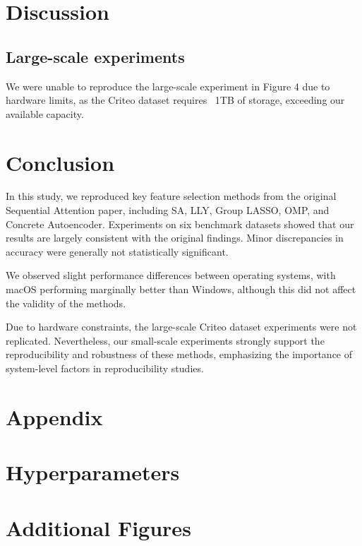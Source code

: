 \documentclass[a4paper,twocolumn]{article} %
\begin{document}
\section{Discussion}


\subsection{ Large-scale experiments}
We were unable to reproduce the large-scale experiment in Figure 4 due to hardware limits, as the Criteo dataset requires ~1TB of storage, exceeding our available capacity.

\section{Conclusion}
In this study, we reproduced key feature selection methods from the original Sequential Attention paper, including SA, LLY, Group LASSO, OMP, and Concrete Autoencoder. Experiments on six benchmark datasets showed that our results are largely consistent with the original findings. Minor discrepancies in accuracy were generally not statistically significant.

We observed slight performance differences between operating systems, with macOS performing marginally better than Windows, although this did not affect the validity of the methods.

Due to hardware constraints, the large-scale Criteo dataset experiments were not replicated. Nevertheless, our small-scale experiments strongly support the reproducibility and robustness of these methods, emphasizing the importance of system-level factors in reproducibility studies.




\clearpage
\appendix
\section*{Appendix}
\section{Hyperparameters}

\section{Additional Figures}
\end{document}
